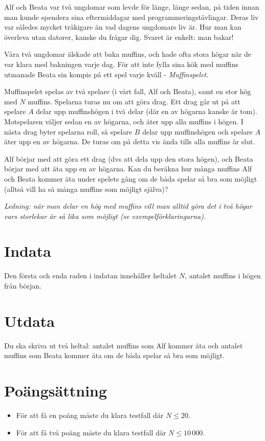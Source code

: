 
Alf och Beata var två ungdomar som levde för länge, länge sedan, på tiden innan man kunde spendera sina eftermiddagar med programmeringstävlingar. Deras liv var således mycket tråkigare än vad dagens ungdomars liv är. Hur man kan överleva utan datorer, kanske du frågar dig. Svaret är enkelt: man bakar!

Våra två ungdomar älskade att baka muffins, och hade ofta stora högar när de var klara med bakningen varje dag. För att inte fylla sina kök med muffins utmanade Beata sin kompis på ett spel varje kväll - \emph{Muffinspelet}.

Muffinspelet spelas av två spelare (i vårt fall, Alf och Beata), samt en stor hög med $N$ muffins. Spelarna turas nu om att göra drag. Ett drag går ut på att spelare $A$ delar upp muffinshögen i två delar (där en av högarna kanske är tom). Motspelaren väljer sedan en av högarna, och äter upp alla muffins i högen. I nästa drag byter spelarna roll, så spelare $B$ delar upp muffinshögen och spelare $A$ äter upp en av högarna. De turas om på detta vis ända tills alla muffins är slut.

Alf börjar med att göra ett drag (dvs att dela upp den stora högen), och Beata börjar med att äta upp en av högarna. Kan du beräkna hur många muffins Alf och Beata kommer äta under spelets gång om de båda spelar så bra som möjligt (alltså vill ha så många muffins som möjligt själva)?

\emph{Ledning: när man delar en hög med muffins vill man alltid göra det i två högar vars storlekar är så lika som möjligt (se exempelförklaringarna).}

\section*{Indata}
Den första och enda raden i indatan innehåller heltalet $N$, antalet muffins i högen från början.

\section*{Utdata}
Du ska skriva ut två heltal: antalet muffins som Alf kommer äta och antalet muffins som Beata kommer äta om de båda spelar så bra som möjligt.

\section*{Poängsättning}
\begin{itemize}
	\item För att få en poäng måste du klara testfall där $N \le 20$.
	\item För att få två poäng måste du klara testfall där $N \le 10\,000$.
\end{itemize}


